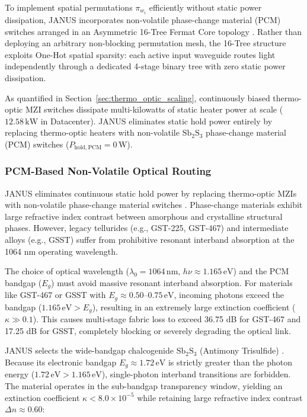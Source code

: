 \documentclass[journal]{IEEEtran}
\begin{document}
To implement spatial permutations $\pi_{w_i}$ efficiently without static power dissipation, JANUS incorporates non-volatile phase-change material (PCM) switches arranged in an Asymmetric 16-Tree Fermat Core topology \cite{Fang2022}\cite{Zhang2021}\cite{Wuttig2017}\cite{Sinatkas2021}. Rather than deploying an arbitrary non-blocking permutation mesh, the 16-Tree structure exploits One-Hot spatial sparsity: each active input waveguide routes light independently through a dedicated 4-stage binary tree with zero static power dissipation.

As quantified in Section~\ref{sec:thermo_optic_scaling}, continuously biased thermo-optic MZI switches dissipate multi-kilowatts of static heater power at scale ($12.58\,\mathrm{kW}$ in Datacenter). JANUS eliminates static hold power entirely by replacing thermo-optic heaters with non-volatile $\mathrm{Sb_2S_3}$ phase-change material (PCM) switches ($P_{\mathrm{hold,PCM}} = 0\,\mathrm{W}$).

\subsubsection{\textbf{PCM-Based Non-Volatile Optical Routing}}

JANUS eliminates continuous static hold power by replacing thermo-optic MZIs with non-volatile phase-change material switches \cite{Xu2019,Zhang2019,Delaney2020,Rios2021}. Phase-change materials exhibit large refractive index contrast between amorphous and crystalline structural phases. However, legacy tellurides (e.g., GST-225, GST-467) and intermediate alloys (e.g., GSST) suffer from prohibitive resonant interband absorption at the 1064 nm operating wavelength. 

The choice of optical wavelength ($\lambda_0 = 1064\,\mathrm{nm}$, $h\nu \approx 1.165\,\mathrm{eV}$) and the PCM bandgap ($E_g$) must avoid massive resonant interband absorption. For materials like GST-467 or GSST with $E_g \approx 0.50\text{--}0.75\,\mathrm{eV}$, incoming photons exceed the bandgap ($1.165\,\mathrm{eV} > E_g$), resulting in an extremely large extinction coefficient ($\kappa \gg 0.1$). This causes multi-stage fabric loss to exceed 36.75 dB for GST-467 and 17.25 dB for GSST, completely blocking or severely degrading the optical link.

JANUS selects the wide-bandgap chalcogenide $\mathrm{Sb_2S_3}$ (Antimony Trisulfide) \cite{Delaney2020}. Because its electronic bandgap $E_g \approx 1.72\,\mathrm{eV}$ is strictly greater than the photon energy ($1.72\,\mathrm{eV} > 1.165\,\mathrm{eV}$), single-photon interband transitions are forbidden. The material operates in the sub-bandgap transparency window, yielding an extinction coefficient $\kappa < 8.0 \times 10^{-5}$ while retaining large refractive index contrast $\Delta n \approx 0.60$:
\end{document}

